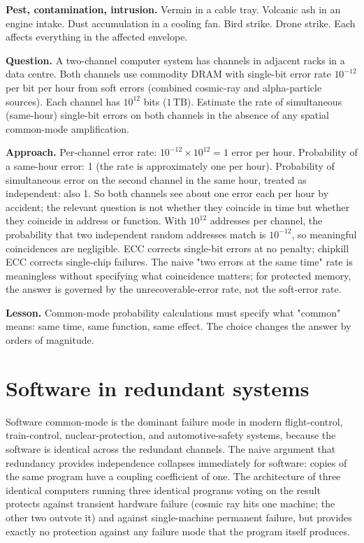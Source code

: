 \textbf{Pest, contamination, intrusion.} Vermin in a cable tray. Volcanic ash in an engine intake. Dust accumulation in a cooling fan. Bird strike. Drone strike. Each affects everything in the affected envelope.

\begin{estimation}
\textbf{Question.} A two-channel computer system has channels in adjacent racks in a data centre. Both channels use commodity DRAM with single-bit error rate $10^{-12}$ per bit per hour from soft errors (combined cosmic-ray and alpha-particle sources). Each channel has $10^{12}$ bits ($1\,\text{TB}$). Estimate the rate of simultaneous (same-hour) single-bit errors on both channels in the absence of any spatial common-mode amplification.

\textbf{Approach.} Per-channel error rate: $10^{-12} \times 10^{12} = 1$ error per hour. Probability of a same-hour error: 1 (the rate is approximately one per hour). Probability of simultaneous error on the second channel in the same hour, treated as independent: also 1. So both channels see about one error each per hour by accident; the relevant question is not whether they coincide in time but whether they coincide in address or function. With $10^{12}$ addresses per channel, the probability that two independent random addresses match is $10^{-12}$, so meaningful coincidences are negligible. ECC corrects single-bit errors at no penalty; chipkill ECC corrects single-chip failures. The naive "two errors at the same time" rate is meaningless without specifying what coincidence matters; for protected memory, the answer is governed by the unrecoverable-error rate, not the soft-error rate.

\textbf{Lesson.} Common-mode probability calculations must specify what "common" means: same time, same function, same effect. The choice changes the answer by orders of magnitude.
\end{estimation}

\section{Software in redundant systems}

Software common-mode is the dominant failure mode in modern flight-control, train-control, nuclear-protection, and automotive-safety systems, because the software is identical across the redundant channels. The naive argument that redundancy provides independence collapses immediately for software: copies of the same program have a coupling coefficient of one. The architecture of three identical computers running three identical programs voting on the result protects against transient hardware failure (cosmic ray hits one machine; the other two outvote it) and against single-machine permanent failure, but provides exactly no protection against any failure mode that the program itself produces.

